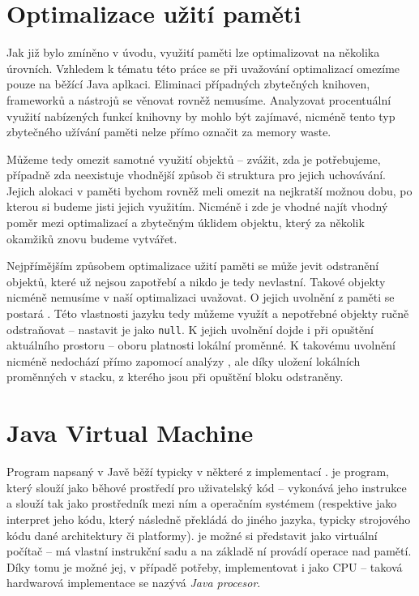


\chapter{Optimalizace užití paměti}

Jak již bylo zmíněno v úvodu, využití paměti lze optimalizovat na několika úrovních. Vzhledem k tématu této práce se při uvažování optimalizací omezíme pouze na běžící Java aplkaci. Eliminaci případných zbytečných knihoven, frameworků a nástrojů se věnovat rovněž nemusíme. Analyzovat procentuální využití nabízených funkcí knihovny by mohlo být zajímavé, nicméně tento typ zbytečného užívání paměti nelze přímo označit za memory waste.

Můžeme tedy omezit samotné využití objektů -- zvážit, zda je potřebujeme, případně zda neexistuje vhodnější způsob či struktura pro jejich uchovávání. Jejich alokaci v paměti bychom rovněž meli omezit na nejkratší možnou dobu, po kterou si budeme jisti jejich využitím. Nicméně i zde je vhodné najít vhodný poměr mezi optimalizací a zbytečným úklidem objektu, který za několik okamžiků znovu budeme vytvářet.

Nejpřímějším způsobem optimalizace užití paměti se může jevit odstranění objektů, které už nejsou zapotřebí a nikdo je tedy nevlastní. Takové objekty nicméně nemusíme v naší optimalizaci uvažovat. O jejich uvolnění z paměti se postará . Této vlastnosti jazyku tedy můžeme využít a nepotřebné objekty ručně odstraňovat -- nastavit je jako \texttt{null}. K jejich uvolnění dojde i při opuštění aktuálního prostoru -- oboru platnosti lokální proměnné. K takovému uvolnění nicméně nedochází přímo zapomocí analýzy , ale díky uložení lokálních proměnných v stacku, z kterého jsou při opuštění bloku odstraněny.






\chapter{Java Virtual Machine}
Program napsaný v Javě běží typicky v některé z implementací .  je program, který slouží jako běhové prostředí pro uživatelský kód -- vykonává jeho instrukce a slouží tak jako prostředník mezi ním a operačním systémem (respektive jako interpret jeho kódu, který následně překládá do jiného jazyka, typicky strojového kódu dané architektury či platformy).  je možné si představit jako virtuální počítač -- má vlastní instrukční sadu a na základě ní provádí operace nad pamětí. Díky tomu je možné jej, v případě potřeby, implementovat i jako CPU -- taková hardwarová implementace se nazývá \textit{Java procesor}. 

